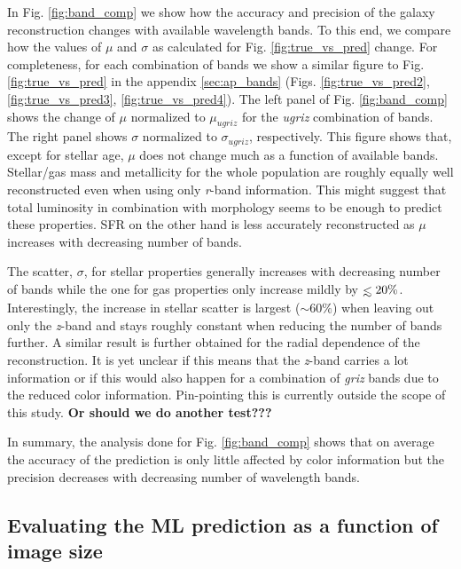 \documentclass[useAMS,usenatbib]{mnras}
\def\lesssim{\mathrel{\hbox{\rlap{\hbox{\lower4pt\hbox{$\sim$}}}\hbox{$<$}}}}
\begin{document}
In Fig. \ref{fig:band_comp} we show how the accuracy and precision of the galaxy reconstruction changes with available wavelength bands. To this end, we compare how the values of $\mu$ and $\sigma$ as calculated for Fig. \ref{fig:true_vs_pred} change. For completeness, for each combination of bands we show a similar figure to Fig. \ref{fig:true_vs_pred} in the appendix \ref{sec:ap_bands} (Figs. \ref{fig:true_vs_pred2}, \ref{fig:true_vs_pred3}, \ref{fig:true_vs_pred4}). The left panel of Fig. \ref{fig:band_comp} shows the change of $\mu$ normalized to $\mu_{ ugriz}$ for the \emph{ugriz} combination of bands. The right panel shows $\sigma$ normalized to $\sigma_{ ugriz}$, respectively.
This figure shows that, except for stellar age, $\mu$ does not change much as a function of available bands. Stellar/gas mass and metallicity for the whole population are roughly equally well reconstructed even when using only \emph{r}-band information. This might suggest that total luminosity in combination with morphology seems to be enough to predict these properties. SFR on the other hand is less accurately reconstructed as $\mu$ increases with decreasing number of bands.  

The scatter, $\sigma$, for stellar properties generally increases with decreasing number of bands while the one for gas properties only increase mildly by $\lesssim20\%$. Interestingly, the increase in stellar scatter is largest ($\sim60\%$) when leaving out only the \emph{z}-band and stays roughly constant when reducing the number of bands further. A similar result is further obtained for the radial dependence of the reconstruction. 
It is yet unclear if this means that the \emph{z}-band carries a lot information or if this would also happen for a combination of \emph{griz} bands due to the reduced color information. Pin-pointing this is currently outside the scope of this study. \textbf{Or should we do another test???}

In summary, the analysis done for Fig. \ref{fig:band_comp} shows that on average the accuracy of the prediction is only little affected by color information but the precision decreases with decreasing number of wavelength bands. 

\subsection{Evaluating the ML prediction as a function of image size}
\label{sec:resolution}
\end{document}
